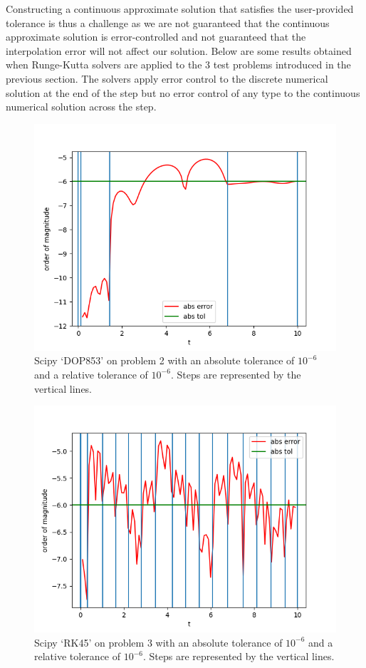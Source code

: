 \documentclass{article}
\begin{document}
Constructing a continuous approximate solution that satisfies the user-provided tolerance is thus a challenge as we are not guaranteed that the continuous approximate solution is error-controlled and not guaranteed that the interpolation error will not affect our solution. Below are some results obtained when Runge-Kutta solvers are applied to the 3 test problems introduced in the previous section. The solvers apply error control to the discrete numerical solution at the end of the step but no error control of any type to the continuous numerical solution across the step.

\begin{figure}[H]
\centering
\includegraphics[width=0.7\linewidth]{./figures/no_middle_step_error_control_p2_dop853}
\caption{Scipy `DOP853' on problem 2 with an absolute tolerance of $10^{-6}$ and a relative tolerance of $10^{-6}$. Steps are represented by the vertical lines.}
\label{fig:no_middle_step_error_control_p2_dop853}
\end{figure}

\begin{figure}[H]
\centering
\includegraphics[width=0.7\linewidth]{./figures/no_middle_step_error_control_p3_rk45}
\caption{Scipy `RK45' on problem 3 with an absolute tolerance of $10^{-6}$ and a relative tolerance of $10^{-6}$. Steps are represented by the vertical lines.}
\label{fig:no_middle_step_error_control_p3_rk45}
\end{figure}
\end{document}

